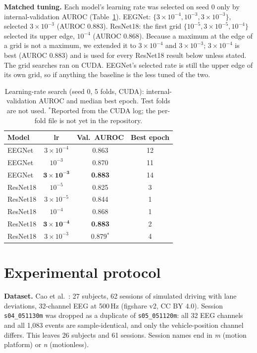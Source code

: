 \documentclass[conference]{IEEEtran}
\begin{document}
\textbf{Matched tuning.} Each model's learning rate was selected on seed 0 only by internal-validation AUROC (Table~\ref{tab:lr}). EEGNet: $\{3\!\times\!10^{-4}, 10^{-3}, 3\!\times\!10^{-3}\}$, selected $3\!\times\!10^{-3}$ (AUROC 0.883). ResNet18: the first grid $\{10^{-5}, 3\!\times\!10^{-5}, 10^{-4}\}$ selected its upper edge, $10^{-4}$ (AUROC 0.868). Because a maximum at the edge of a grid is not a maximum, we extended it to $3\!\times\!10^{-4}$ and $3\!\times\!10^{-3}$; $3\!\times\!10^{-4}$ is best (AUROC 0.883) and is used for every ResNet18 result below unless stated. The grid searches ran on CUDA. EEGNet's selected rate is still the upper edge of its own grid, so if anything the baseline is the less tuned of the two.

\begin{table}[t]
\centering
\caption{Learning-rate search (seed 0, 5 folds, CUDA): internal-validation AUROC and median best epoch. Test folds are not used. $^{*}$Reported from the CUDA log; the per-fold file is not yet in the repository.}
\label{tab:lr}
\footnotesize
\begin{tabular}{@{}lccc@{}}
\toprule
Model & lr & Val.\ AUROC & Best epoch \\
\midrule
EEGNet & $3\times10^{-4}$ & 0.863 & 12 \\
EEGNet & $10^{-3}$ & 0.870 & 11 \\
EEGNet & $\mathbf{3\times10^{-3}}$ & \textbf{0.883} & 14 \\
ResNet18 & $10^{-5}$ & 0.825 & 3 \\
ResNet18 & $3\times10^{-5}$ & 0.844 & 1 \\
ResNet18 & $10^{-4}$ & 0.868 & 1 \\
ResNet18 & $\mathbf{3\times10^{-4}}$ & \textbf{0.883} & 2 \\
ResNet18 & $3\times10^{-3}$ & 0.879$^{*}$ & 4 \\
\bottomrule
\end{tabular}
\end{table}

\section{Experimental protocol}
\textbf{Dataset.} Cao et al.~\cite{cao2019,cao2019figshare}: 27 subjects, 62 sessions of simulated driving with lane deviations, 32-channel EEG at 500\,Hz (figshare v2, CC BY 4.0). Session \texttt{s04\_051130m} was dropped as a duplicate of \texttt{s05\_051120m}: all 32 EEG channels and all 1{,}083 events are sample-identical, and only the vehicle-position channel differs. This leaves 26 subjects and 61 sessions. Session names end in \emph{m} (motion platform) or \emph{n} (motionless).
\end{document}
